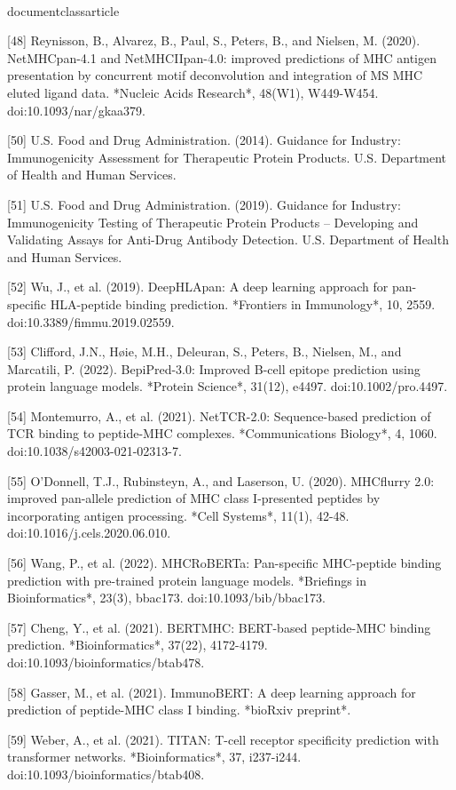 \\documentclass{article}
\begin{document}
[48] Reynisson, B., Alvarez, B., Paul, S., Peters, B., and Nielsen, M. (2020). NetMHCpan-4.1 and NetMHCIIpan-4.0: improved predictions of MHC antigen presentation by concurrent motif deconvolution and integration of MS MHC eluted ligand data. *Nucleic Acids Research*, 48(W1), W449-W454. doi:10.1093/nar/gkaa379.

[50] U.S. Food and Drug Administration. (2014). Guidance for Industry: Immunogenicity Assessment for Therapeutic Protein Products. U.S. Department of Health and Human Services.

[51] U.S. Food and Drug Administration. (2019). Guidance for Industry: Immunogenicity Testing of Therapeutic Protein Products -- Developing and Validating Assays for Anti-Drug Antibody Detection. U.S. Department of Health and Human Services.

[52] Wu, J., et al. (2019). DeepHLApan: A deep learning approach for pan-specific HLA-peptide binding prediction. *Frontiers in Immunology*, 10, 2559. doi:10.3389/fimmu.2019.02559.

[53] Clifford, J.N., Høie, M.H., Deleuran, S., Peters, B., Nielsen, M., and Marcatili, P. (2022). BepiPred-3.0: Improved B-cell epitope prediction using protein language models. *Protein Science*, 31(12), e4497. doi:10.1002/pro.4497.

[54] Montemurro, A., et al. (2021). NetTCR-2.0: Sequence-based prediction of TCR binding to peptide-MHC complexes. *Communications Biology*, 4, 1060. doi:10.1038/s42003-021-02313-7.

[55] O'Donnell, T.J., Rubinsteyn, A., and Laserson, U. (2020). MHCflurry 2.0: improved pan-allele prediction of MHC class I-presented peptides by incorporating antigen processing. *Cell Systems*, 11(1), 42-48. doi:10.1016/j.cels.2020.06.010.

[56] Wang, P., et al. (2022). MHCRoBERTa: Pan-specific MHC-peptide binding prediction with pre-trained protein language models. *Briefings in Bioinformatics*, 23(3), bbac173. doi:10.1093/bib/bbac173.

[57] Cheng, Y., et al. (2021). BERTMHC: BERT-based peptide-MHC binding prediction. *Bioinformatics*, 37(22), 4172-4179. doi:10.1093/bioinformatics/btab478.

[58] Gasser, M., et al. (2021). ImmunoBERT: A deep learning approach for prediction of peptide-MHC class I binding. *bioRxiv preprint*.

[59] Weber, A., et al. (2021). TITAN: T-cell receptor specificity prediction with transformer networks. *Bioinformatics*, 37, i237-i244. doi:10.1093/bioinformatics/btab408.
\end{document}
